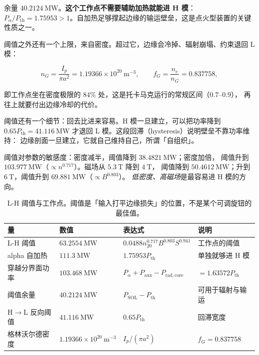 余量 $40.2124\ \mathrm{MW}$。\textbf{这个工作点不需要辅助加热就能进 H 模}：
$P_\alpha/P_{\mathrm{th}}=1.75953>1$。自加热足够撑起边缘的输运壁垒，这是点火型装置的关键性质之一。

阈值之外还有一个上限，来自密度。超过它，边缘会冷掉、辐射崩塌、约束退回 L 模：

\begin{equation}
n_G=\frac{I_p}{\pi a^2}=1.19366\times10^{20}\ \mathrm{m^{-3}},
\qquad f_G=\frac{n_e}{n_G}=0.837758,
\label{eq:app-ad-greenwald}
\end{equation}

即工作点坐在密度极限的 $84\%$ 处，这是托卡马克运行的常规区间（$0.7$--$0.9$），
再往上就要付出边缘冷却的代价。

阈值还有一个细节：回去比进来容易。H 模一旦建立，可以把功率降到 $0.65P_{\mathrm{th}}=41.116\ \mathrm{MW}$
才退回 L 模。这段回滞（hysteresis）说明壁垒不靠功率维持：
边缘剖面一旦建立，它就自己维持自己，所谓「自组织」。

阈值对参数的敏感度：密度减半，阈值降到 $38.4821\ \mathrm{MW}$；密度加倍，
阈值升到 $103.977\ \mathrm{MW}$（$\propto n^{0.717}$）。磁场从 $5.3\ \mathrm{T}$ 降到 $4\ \mathrm{T}$，
阈值降到 $50.4612\ \mathrm{MW}$；升到 $6\ \mathrm{T}$，阈值升到 $69.881\ \mathrm{MW}$（$\propto B^{0.803}$）。
\emph{低密度、高磁场}是最容易进 H 模的方向。

\begin{table}[htbp]
\centering
\small
\caption{L-H 阈值与工作点。阈值是「输入打平边缘损失」的位置，不是某个可调旋钮的最佳值。}
\label{tab:app-ad-threshold}
\begin{tabular}{p{3.4cm}p{3.3cm}p{4.2cm}p{4.0cm}}
\toprule
量 & 数值 & 表达式 & 说明 \\
\midrule
L-H 阈值 & $63.2554\ \mathrm{MW}$ & $0.0488 n_{20}^{0.717}B^{0.803}S^{0.941}$ & 工作点的阈值 \\
alpha 自加热 & $111.3\ \mathrm{MW}$ & $1.75953P_{\mathrm{th}}$ & 单独就够进 H 模 \\
穿越分界面功率 & $103.468\ \mathrm{MW}$ & $P_\alpha+P_{\mathrm{aux}}-P_{\mathrm{rad,core}}$ & $=1.63572P_{\mathrm{th}}$ \\
阈值余量 & $40.2124\ \mathrm{MW}$ & $P_{\mathrm{SOL}}-P_{\mathrm{th}}$ & 可用于辐射与输运 \\
H$\to$L 反向阈值 & $41.116\ \mathrm{MW}$ & $0.65P_{\mathrm{th}}$ & 回滞宽度 \\
格林沃尔德密度 & $1.19366\times10^{20}\ \mathrm{m^{-3}}$ & $I_p/(\pi a^2)$ & $f_G=0.837758$ \\
\bottomrule
\end{tabular}

\end{table}

